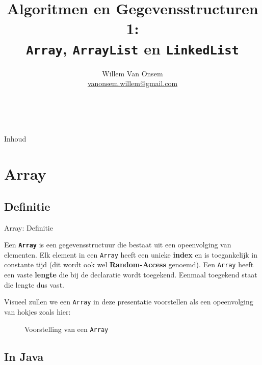 \documentclass[handout]{beamer}
\title{Algoritmen en Gegevensstructuren 1:\\ \texttt{Array}, \texttt{ArrayList} en \texttt{LinkedList}}
\author{Willem Van Onsem\\ \href{mailto:vanonsem.willem@gmail.com?Subject=Presentatie\%20Algoritmen\%20en\%20Gegevensstructuren\%201}{vanonsem.willem@gmail.com}}
\theoremstyle{remark}
\newcommand{\term}[1]{\textbf{#1}}
\newcommand{\dsarray}{\texttt{Array}}
\begin{document}
\begin{frame}
\maketitle
\vfill
\begin{center}\\[2.5ex]{\tiny\CcNote{\CcLongnameByNcSa}}\vspace*{-2.5ex}
\end{center}
\end{frame}
\begin{frame}[plain]{Inhoud}
\begin{multicols}{2}
\tableofcontents
\end{multicols}
\end{frame}
\section{Array}
\subsection{Definitie}
\begin{frame}{Array: Definitie}
\begin{definition}[Array]
Een \term{\dsarray{}} is een gegevensstructuur die bestaat uit een opeenvolging van elementen. Elk element in een \dsarray{} heeft een unieke \term{index} en is toegankelijk in constante tijd (dit wordt ook wel \term{Random-Access} genoemd). Een \dsarray{} heeft een vaste \term{lengte} die bij de declaratie wordt toegekend. Eenmaal toegekend staat die lengte dus vast.
\end{definition}
Visueel zullen we een \dsarray{} in deze presentatie voorstellen als een opeenvolging van hokjes zoals hier:
\begin{figure}
\caption{Voorstelling van een \dsarray{}}
\end{figure}
\end{frame}
\subsection{In Java}
\end{document}
